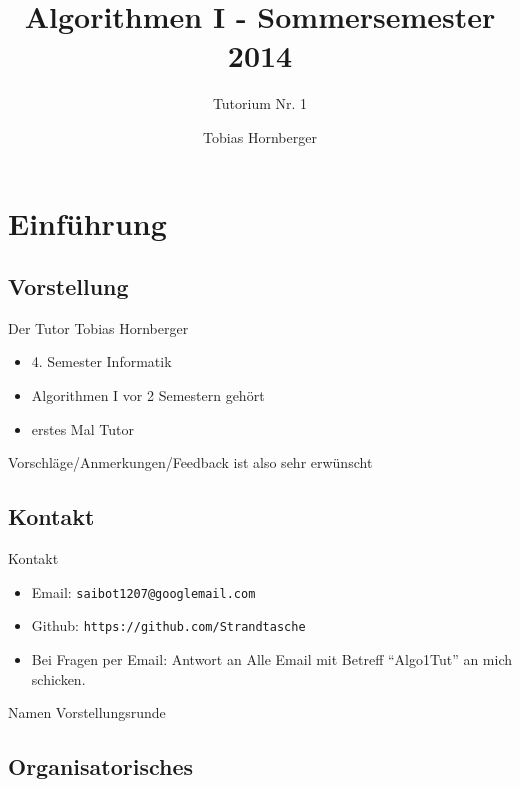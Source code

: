 \documentclass[18pt]{beamer}
\title[Algo Tutorium Nr.1]{Algorithmen I - Sommersemester 2014}
\subtitle{Tutorium Nr. 1}
\author{Tobias Hornberger}
\institute{Institut für Theoretische Informatik}
\begin{document}

\begin{frame}
\titlepage
\end{frame}


\section{Einführung}
	\subsection{Vorstellung}
	\begin{frame}{Der Tutor}
		Tobias Hornberger
		\begin{itemize}
			\item 4. Semester Informatik
			\item Algorithmen I vor 2 Semestern gehört
			\item erstes Mal Tutor
		\end{itemize}
		Vorschläge/Anmerkungen/Feedback ist also sehr erwünscht
	\end{frame}

	\subsection{Kontakt}
	\begin{frame}{Kontakt}
		\begin{itemize}
			\item Email: \texttt{saibot1207@googlemail.com}
			\item Github: \texttt{https://github.com/Strandtasche}
			\item Bei Fragen per Email: Antwort an Alle
			Email mit Betreff "`Algo1Tut"' an mich schicken.
		\end{itemize}
	\end{frame}
	
	\begin{frame}{Namen}
		Vorstellungsrunde		
	\end{frame}

	\subsection{Organisatorisches}
\end{document}
